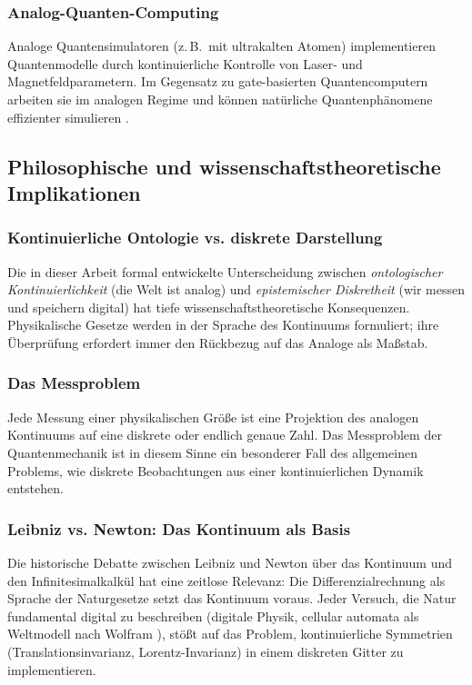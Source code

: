 ﻿\documentclass[a4paper,12pt]{article}
\theoremstyle{definition}
\begin{document}
\subsubsection{Analog-Quanten-Computing}

Analoge Quantensimulatoren (z.\,B.\ mit ultrakalten Atomen) implementieren
Quantenmodelle durch kontinuierliche Kontrolle von Laser- und Magnetfeldparametern.
Im Gegensatz zu gate-basierten Quantencomputern arbeiten sie im analogen Regime
und können natürliche Quantenphänomene effizienter simulieren \citep{Bloch2012}.

\subsection{Philosophische und wissenschaftstheoretische Implikationen}

\subsubsection{Kontinuierliche Ontologie vs. diskrete Darstellung}

Die in dieser Arbeit formal entwickelte Unterscheidung zwischen
\emph{ontologischer Kontinuierlichkeit} (die Welt ist analog) und
\emph{epistemischer Diskretheit} (wir messen und speichern digital) hat
tiefe wissenschaftstheoretische Konsequenzen.  Physikalische Gesetze werden
in der Sprache des Kontinuums formuliert; ihre Überprüfung erfordert immer
den Rückbezug auf das Analoge als Maßstab.

\subsubsection{Das Messproblem}

Jede Messung einer physikalischen Größe ist eine Projektion des
analogen Kontinuums auf eine diskrete oder endlich genaue Zahl.
Das Messproblem der Quantenmechanik ist in diesem Sinne ein besonderer Fall
des allgemeinen Problems, wie diskrete Beobachtungen aus einer kontinuierlichen
Dynamik entstehen.

\subsubsection{Leibniz vs. Newton: Das Kontinuum als Basis}

Die historische Debatte zwischen Leibniz und Newton über das Kontinuum und den
Infinitesimalkalkül \citep{Leibniz1684} hat eine zeitlose Relevanz:
Die Differenzialrechnung als Sprache der Naturgesetze setzt das Kontinuum voraus.
Jeder Versuch, die Natur fundamental digital zu beschreiben (digitale Physik,
cellular automata als Weltmodell nach Wolfram \citep{Wolfram2002}), stößt auf
das Problem, kontinuierliche Symmetrien (Translationsinvarianz, Lorentz-Invarianz)
in einem diskreten Gitter zu implementieren.
\end{document}

